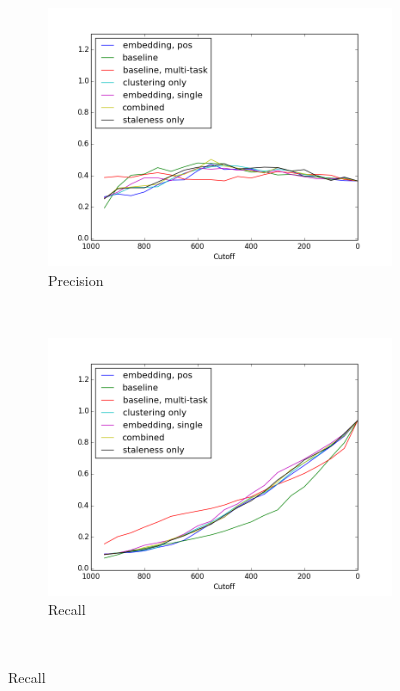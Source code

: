 \documentclass{article}
\begin{document}
\def \officialRunWidth {0.23\textwidth}
\begin{figure}[tb]
  \centering
    \begin{subfigure}[b]{\officialRunWidth}
            \includegraphics[width=\textwidth,clip=true,trim=15mm 0mm 15mm 5mm]{fig/macroPrecision}
			\caption{Precision}
			\label{official:macroprec}
    \end{subfigure}
    ~
    \begin{subfigure}[b]{\officialRunWidth}
            \includegraphics[width=\textwidth,clip=true,trim=15mm 0mm 15mm 5mm]{fig/macroRecall}
			\caption{Recall}
			\label{official:macrorecall}
    \end{subfigure}
    \\

\end{figure}
\end{document}
